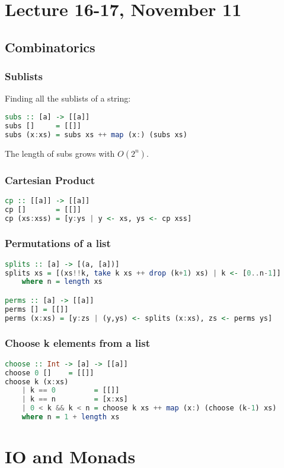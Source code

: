 \documentclass{article}
\begin{document}
\section{Lecture 16-17, November 11}
\subsection{Combinatorics}
\subsubsection{Sublists}
Finding all the sublists of a string:
\begin{lstlisting}[language=haskell]
subs :: [a] -> [[a]]
subs []     = [[]]
subs (x:xs) = subs xs ++ map (x:) (subs xs)
\end{lstlisting}
The length of subs grows with $O(2^n)$.
\subsubsection{Cartesian Product}
\begin{lstlisting}[language=haskell]
cp :: [[a]] -> [[a]]
cp []       = [[]]
cp (xs:xss) = [y:ys | y <- xs, ys <- cp xss]
\end{lstlisting}
\subsubsection{Permutations of a list}
\begin{lstlisting}[language=haskell]
splits :: [a] -> [(a, [a])]
splits xs = [(xs!!k, take k xs ++ drop (k+1) xs) | k <- [0..n-1]]
    where n = length xs

perms :: [a] -> [[a]]
perms [] = [[]]
perms (x:xs) = [y:zs | (y,ys) <- splits (x:xs), zs <- perms ys]
\end{lstlisting}
\subsubsection{Choose k elements from a list}
\begin{lstlisting}[language=haskell]
choose :: Int -> [a] -> [[a]]
choose 0 []    = [[]]
choose k (x:xs)
    | k == 0         = [[]]
    | k == n         = [x:xs]
    | 0 < k && k < n = choose k xs ++ map (x:) (choose (k-1) xs)
    where n = 1 + length xs
\end{lstlisting}
\section{IO and Monads}
\end{document}
